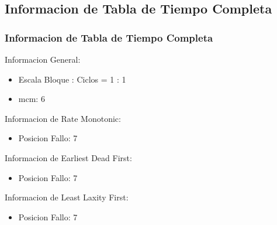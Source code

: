 \documentclass[xcolor=table]{beamer}
\begin{document}
\begin{frame}
\begin{table}
\centering 
{} 
\caption{ Least Laxity First 1 } 
\end{table} 
\end{frame} 

\subsection{Informacion de Tabla de Tiempo Completa} 

\begin{frame} 
\frametitle{Informacion de Tabla de Tiempo Completa} 
Informacion General:\\ 
\begin{itemize} 
\item Escala Bloque : Ciclos = 1 : 1 \\ 
\item mcm:  6 \\ 
\end{itemize} 
Informacion de Rate Monotonic:\\ 
\begin{itemize} 
\item Posicion Fallo:  7 \\ 
\end{itemize} 
Informacion de Earliest Dead First:\\ 
\begin{itemize} 
\item Posicion Fallo:  7 \\ 
\end{itemize} 
Informacion de Least Laxity First:\\ 
\begin{itemize} 
\item Posicion Fallo:  7 \\ 
\end{itemize} 
\end{frame} 

\end{document}
